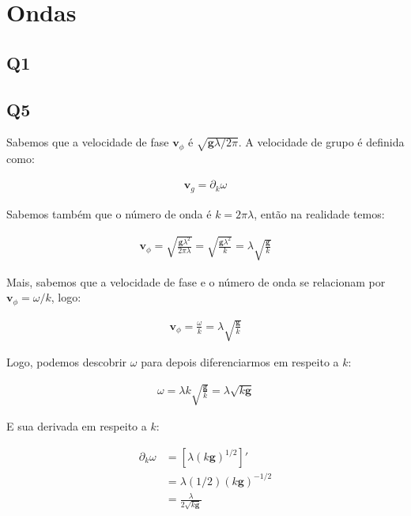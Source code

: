 \documentclass{antiquebook}
\begin{document}
	\chapter{Ondas}

	\section{Q1}

	\section{Q5}

	Sabemos que a velocidade de fase $\mathbf{v}_\phi$ é $\sqrt{\mathbf{g}\lambda/2\pi}$.
	A velocidade de grupo é definida como:

	\begin{align*}
		\mathbf{v}_g = \partial_k \omega 
	\end{align*}
	
	Sabemos também que o número de onda é $k = 2\pi \lambda$, então na realidade temos:

	\begin{align*}
		\mathbf{v}_\phi = \sqrt{\frac{\mathbf{g} \lambda^2}{2\pi \lambda} } =
		\sqrt{\frac{\mathbf{g} \lambda^2}{k} } = \lambda \sqrt{\frac{\mathbf{g}}{k} }
	\end{align*}

	Mais, sabemos que a velocidade de fase e o número de onda se relacionam por
	$\mathbf{v}_\phi = \omega / k$, logo:

	\begin{align*}
		\mathbf{v}_\phi = \frac{\omega}{k} = \lambda \sqrt{\frac{\mathbf{g}}{k} }
	\end{align*}

	Logo, podemos descobrir $\omega$ para depois diferenciarmos em respeito a $k$:

	\begin{align*}
		\omega = \lambda k \sqrt{\frac{\mathbf{g}}{k} } = \lambda \sqrt{k\mathbf{g} }
	\end{align*}

	E sua derivada em respeito a $k$:

	\begin{align*}
		\partial_k\omega &= [\lambda(k\mathbf{g})^{1/2}]' \\
		&= \lambda (1/2)(k\mathbf{g})^{-1/2} \\
		&= \frac{\lambda}{2\sqrt{k\mathbf{g}}} 
	\end{align*}
\end{document}
